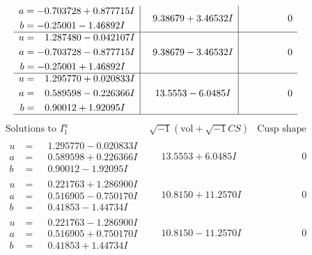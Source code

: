 \documentclass[1p]{elsarticle_modified}
\theoremstyle{definition}
\newcommand{\I}{\sqrt{-1}}
\begin{document}
$$\begin{array}{c|c|c}
\begin{aligned}
a &= -0.703728 + 0.877715 I \\
b &= -0.25001 - 1.46892 I\end{aligned}
 & \phantom{-}9.38679 + 3.46532 I & \phantom{-0.000000 } 0 \\ \hline\begin{aligned}
u &= \phantom{-}1.287480 - 0.042107 I \\
a &= -0.703728 - 0.877715 I \\
b &= -0.25001 + 1.46892 I\end{aligned}
 & \phantom{-}9.38679 - 3.46532 I & \phantom{-0.000000 } 0 \\ \hline\begin{aligned}
u &= \phantom{-}1.295770 + 0.020833 I \\
a &= \phantom{-}0.589598 - 0.226366 I \\
b &= \phantom{-}0.90012 + 1.92095 I\end{aligned}
 & \phantom{-}13.5553 - 6.0485 I & \phantom{-0.000000 } 0\\
 \hline 
 \end{array}$$\newpage$$\begin{array}{c|c|c}  
\text{Solutions to }I^u_{1}& \I (\text{vol} + \sqrt{-1}CS) & \text{Cusp shape}\\
 \hline 
\begin{aligned}
u &= \phantom{-}1.295770 - 0.020833 I \\
a &= \phantom{-}0.589598 + 0.226366 I \\
b &= \phantom{-}0.90012 - 1.92095 I\end{aligned}
 & \phantom{-}13.5553 + 6.0485 I & \phantom{-0.000000 } 0 \\ \hline\begin{aligned}
u &= \phantom{-}0.221763 + 1.286900 I \\
a &= \phantom{-}0.516905 - 0.750170 I \\
b &= \phantom{-}0.41853 - 1.44734 I\end{aligned}
 & \phantom{-}10.8150 + 11.2570 I & \phantom{-0.000000 } 0 \\ \hline\begin{aligned}
u &= \phantom{-}0.221763 - 1.286900 I \\
a &= \phantom{-}0.516905 + 0.750170 I \\
b &= \phantom{-}0.41853 + 1.44734 I\end{aligned}
 & \phantom{-}10.8150 - 11.2570 I & \phantom{-0.000000 } 0 \\ \hline\begin{aligned}

\end{aligned}
\end{array}$$
\end{document}
